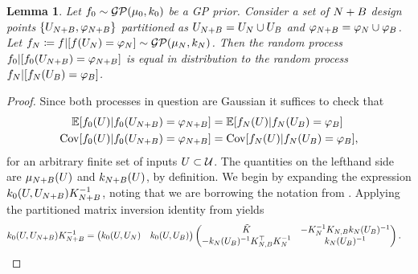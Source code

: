 \documentclass[12pt]{article}
\newtheorem{lemma}{Lemma}
\begin{document}
\begin{lemma} \label{lemma:gp-condition-order}
Let $\funcPrior \sim \GP(\gpMeanPrior, \gpKerPrior)$ be a GP prior. Consider a set of $\Naugment$ design points $\{\designIn[\Naugment], \funcVal[\Naugment]\}$
partitioned as $\designIn[\Naugment] = \designIn[\Ndesign] \cup \designBatchIn$ and $\funcVal[\Naugment] = \funcVal[\Ndesign] \cup \funcVal[\Nbatch]$.
Let $\funcEm[\Ndesign] \Def \func | [\func(\designIn[\Ndesign]) = \funcVal[\Ndesign]] \sim \GP(\gpMean[\Ndesign], \gpKer[\Ndesign])$. 
Then the random process $\funcPrior | [\funcPrior(\designIn[\Naugment]) = \funcVal[\Naugment]]$ is equal in distribution to the random process
$\funcEm[\Ndesign] | [\funcEm[\Ndesign](\designIn[\Nbatch]) = \funcVal[\Nbatch]]$. 
\end{lemma} 

\begin{proof} 
Since both processes in question are Gaussian it suffices to check that 
\begin{align*}
\E[\funcPrior(\parMat) | \funcPrior(\designIn[\Naugment]) = \funcVal[\Naugment]] 
&= \E[\funcEm[\Ndesign](\parMat) | \funcEm[\Ndesign](\designIn[\Nbatch]) = \funcVal[\Nbatch]] \\
\Cov[\funcPrior(\parMat) | \funcPrior(\designIn[\Naugment]) = \funcVal[\Naugment]] 
&= \Cov[\funcEm[\Ndesign](\parMat) | \funcEm[\Ndesign](\designIn[\Nbatch]) = \funcVal[\Nbatch]],
\end{align*}
for an arbitrary finite set of inputs $\parMat \subset \parSpace$. The quantities on the lefthand side are 
$\gpMean[\Naugment](\parMat)$ and $\gpKer[\Naugment](\parMat)$, by definition. We begin by expanding 
the expression $\gpKerPrior(\parMat, \designIn[\Naugment]) \kerMat[\Naugment]^{-1}$, noting that we 
are borrowing the notation from . Applying the partitioned matrix 
inversion identity from  yields 
\begin{align*}
\gpKerPrior(\parMat, \designIn[\Naugment]) \kerMat[\Naugment]^{-1}
&= \begin{pmatrix} \gpKerPrior(\parMat, \designIn[\Ndesign]) &  \gpKerPrior(\parMat, \designIn[\Nbatch]) \end{pmatrix}
\begin{pmatrix} \tilde{K} & -\kerMat[\Ndesign]^{-1} \kerMat[\Ndesign,\Nbatch] \gpKer[\Ndesign](\designBatchIn)^{-1} \\
-\gpKer[\Ndesign](\designBatchIn)^{-1} \kerMat[\Ndesign,\Nbatch]^\top  \kerMat[\Ndesign]^{-1} & \gpKer[\Ndesign](\designBatchIn)^{-1} \end{pmatrix}.

\end{align*}
\end{proof}
\end{document}
